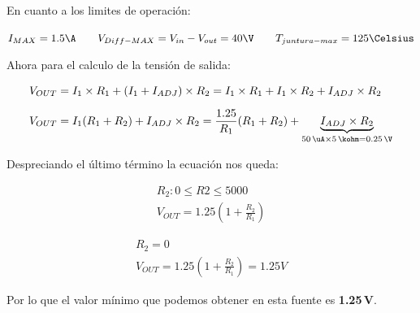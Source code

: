 \documentclass[chaptersright]{informeutn}
\begin{document}
        En cuanto a los limites de operación:

        \begin{center}
          $I_{MAX}=1.5\A \qquad V_{Diff-MAX}=V_{in}-V_{out}=40\V \qquad T_{juntura-max}=125\Celsius$
        \end{center}

        Ahora para el calculo de la tensión de salida:

        \begin{align*}
          V_{OUT} &= I_1 \times R_1 + \left(I_1 + I_{ADJ}\right) \times R_2
          = I_1 \times R_1 + I_1 \times R_2 + I_{ADJ} \times R_2 \\[6pt]
          V_{OUT} &= I_1 (R_1 + R_2) + I_{ADJ} \times R_2
          = \frac{1.25}{R_1} (R_1 + R_2) + \underbrace{I_{ADJ} \times R_2}_{50\,\uA \times 5\,\kohm = 0.25\,\V}
        \end{align*}

        Despreciando el último término la ecuación nos queda:

        \begin{figure}[H]
          \centering
          \begin{minipage}{0.4\textwidth}
            \begin{gather*}
              R_2: 0 \leq R2 \leq 5000\\
              V_{OUT} = 1.25 \left(1 + \frac{R_2}{R_1}\right)
            \end{gather*}
          \end{minipage}
          \hspace{1cm}
          \begin{minipage}{0.4\textwidth}
            \begin{gather*}
              R_2 = 0\\
              V_{OUT} = 1.25 \left(1 + \frac{R_2}{R_1}\right) = 1.25V
            \end{gather*}
          \end{minipage}
        \end{figure}

        Por lo que el valor mínimo que podemos obtener en esta fuente es \textbf{1.25\,V}.
\end{document}

